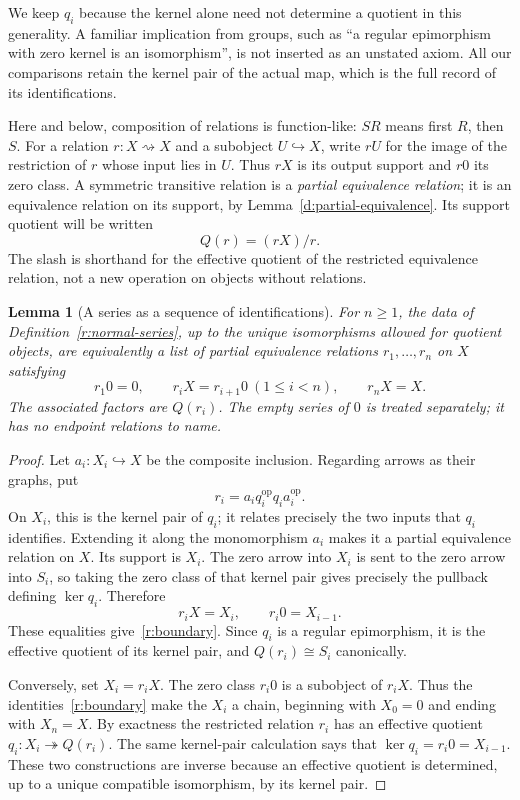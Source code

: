 \documentclass[11pt]{article}
\newtheorem{lemma}[theorem]{Lemma}
\theoremstyle{definition}
\theoremstyle{remark}\newtheorem{remark}[theorem]{Remark}
\begin{document}
We keep $q_i$ because the kernel alone need not determine a quotient in
this generality.  A familiar implication from groups, such as ``a regular
epimorphism with zero kernel is an isomorphism'', is not inserted as an
unstated axiom.  All our comparisons retain the kernel pair of the actual
map, which is the full record of its identifications.

Here and below, composition of relations is function-like: $SR$ means
first $R$, then $S$.  For a relation $r:X\rightsquigarrow X$ and a subobject
$U\hookrightarrow X$, write $rU$ for the image of the restriction of $r$
whose input lies in $U$.  Thus $rX$ is its output support and $r0$ its zero
class.  A symmetric transitive relation is a \emph{partial equivalence
relation}; it is an equivalence relation on its support, by
Lemma~\ref{d:partial-equivalence}.  Its support quotient will be written
\[
                    Q(r)=(rX)/r.
\]
The slash is shorthand for the effective quotient of the restricted
equivalence relation, not a new operation on objects without relations.

\begin{lemma}[A series as a sequence of identifications]
\label{r:series-relations}
For $n\geq1$, the data of Definition~\ref{r:normal-series}, up to the unique isomorphisms
allowed for quotient objects, are equivalently a list of partial equivalence
relations $r_1,\ldots,r_n$ on $X$ satisfying
\begin{equation}
\label{r:boundary}
 r_1 0=0,\qquad r_iX=r_{i+1}0\ (1\leq i<n),\qquad r_nX=X.
\end{equation}
The associated factors are $Q(r_i)$. The empty series of $0$ is treated
separately; it has no endpoint relations to name.
\end{lemma}

\begin{proof}
Let $a_i:X_i\hookrightarrow X$ be the composite inclusion.  Regarding
arrows as their graphs, put
\[
       r_i=a_iq_i^{\mathrm{op}}q_i a_i^{\mathrm{op}}.
\]
On $X_i$, this is the kernel pair of $q_i$; it relates precisely the two
inputs that $q_i$ identifies.  Extending it along the monomorphism $a_i$
makes it a partial equivalence relation on $X$.  Its support is $X_i$.
The zero arrow into $X_i$ is sent to the zero arrow into $S_i$, so taking
the zero class of that kernel pair gives precisely the pullback defining
$\ker q_i$.  Therefore
\[
                 r_iX=X_i,\qquad r_i0=X_{i-1}.
\]
These equalities give~\eqref{r:boundary}.  Since $q_i$ is a regular
epimorphism, it is the effective quotient of its kernel pair, and
$Q(r_i)\cong S_i$ canonically.

Conversely, set $X_i=r_iX$.  The zero class $r_i0$ is a subobject of $r_iX$.
Thus the identities~\eqref{r:boundary} make the $X_i$ a chain, beginning
with $X_0=0$ and ending with $X_n=X$.  By exactness the restricted relation
$r_i$ has an effective quotient $q_i:X_i\twoheadrightarrow Q(r_i)$.
The same kernel-pair calculation says that $\ker q_i=r_i0=X_{i-1}$.
These two constructions are inverse because an effective quotient is
determined, up to a unique compatible isomorphism, by its kernel pair.
\end{proof}
\end{document}
